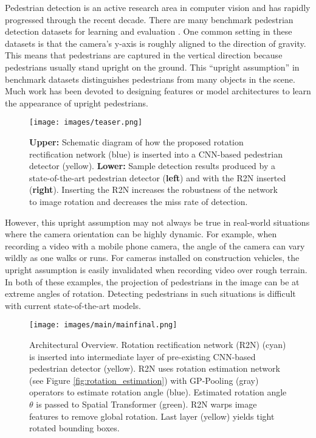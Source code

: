 \documentclass[10pt,twocolumn,letterpaper]{article}
\begin{document}
Pedestrian detection is an active research area in computer vision and has rapidly progressed through the recent decade. There are many benchmark pedestrian detection datasets for learning and evaluation \cite{Dollar2012, Geiger2012, eth_biwi_00534, Dalal2005}. One common setting in these datasets is that the camera's y-axis is roughly aligned to the direction of gravity. This means that pedestrians are captured in the vertical direction because pedestrians usually stand upright on the ground. This ``upright assumption'' in benchmark datasets distinguishes pedestrians from many objects in the scene. Much work has been devoted to designing features \cite{Dalal2005, Felzenszwalb2009} or model architectures \cite{Zhang2016, Ouyang_2013_ICCV, Tian2015} to learn the appearance of upright pedestrians.

\begin{figure}[!t]
\texttt{[image: images/teaser.png]}
\caption{ \textbf{Upper:} Schematic diagram of how the proposed rotation rectification network (blue) is inserted into a CNN-based pedestrian detector (yellow). \textbf{Lower:} Sample detection results produced by a state-of-the-art pedestrian detector (\textbf{left}) and with the R2N inserted (\textbf{right}). Inserting the R2N increases the robustness of the network to image rotation and decreases the miss rate of detection.}
\end{figure}
However, this upright assumption may not always be true in real-world situations where the camera orientation can be highly dynamic. For example, when recording a video with a mobile phone camera, the angle of the camera can vary wildly as one walks or runs. For cameras installed on construction vehicles, the upright assumption is easily invalidated when recording video over rough terrain. In both of these examples, the projection of pedestrians in the image can be at extreme angles of rotation. Detecting pedestrians in such situations is difficult with current state-of-the-art models.



\begin{figure*}[!t]
    \centering
    \texttt{[image: images/main/mainfinal.png]}
    \caption{Architectural Overview. Rotation rectification network (R2N) (cyan) is inserted into intermediate layer of pre-existing CNN-based pedestrian detector (yellow). R2N uses rotation estimation network (see Figure \ref{fig:rotation_estimation}) with GP-Pooling (gray) operators to estimate rotation angle (blue). Estimated rotation angle $\theta$ is passed to Spatial Transformer (green). R2N warps image features to remove global rotation. Last layer (yellow) yields tight rotated bounding boxes.}
    \label{fig:main}
    \vspace{-3mm}
\end{figure*}
\end{document}
